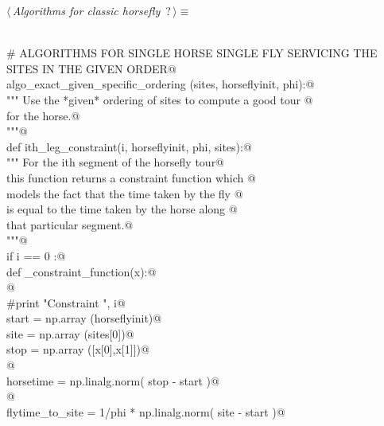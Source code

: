 \documentclass[11.5pt]{report}
\begin{document}
\begin{flushleft} \small\label{scrap21}\raggedright\small
{} $\langle\,${\itshape Algorithms for classic horsefly}\nobreak\ {\footnotesize {?}}$\,\rangle\equiv$
\vspace{-1ex}
\begin{list}{}{} \item
\mbox{}\verb@@\\
\mbox{}\verb@# ALGORITHMS FOR SINGLE HORSE SINGLE FLY SERVICING THE SITES IN THE GIVEN ORDER@\\
\mbox{}\verb@def algo_exact_given_specific_ordering (sites, horseflyinit, phi):@\\
\mbox{}\verb@    """ Use the *given* ordering of sites to compute a good tour @\\
\mbox{}\verb@    for the horse.@\\
\mbox{}\verb@    """@\\
\mbox{}\verb@    def ith_leg_constraint(i, horseflyinit, phi, sites):@\\
\mbox{}\verb@        """ For the ith segment of the horsefly tour@\\
\mbox{}\verb@        this function returns a constraint function which @\\
\mbox{}\verb@        models the fact that the time taken by the fly @\\
\mbox{}\verb@        is equal to the time taken by the horse along @\\
\mbox{}\verb@        that particular segment.@\\
\mbox{}\verb@        """@\\
\mbox{}\verb@        if i == 0 :@\\
\mbox{}\verb@            def _constraint_function(x):@\\
\mbox{}\verb@            @\\
\mbox{}\verb@                #print "Constraint  ", i@\\
\mbox{}\verb@                start = np.array (horseflyinit)@\\
\mbox{}\verb@                site  = np.array (sites[0])@\\
\mbox{}\verb@                stop  = np.array ([x[0],x[1]])@\\
\mbox{}\verb@            @\\
\mbox{}\verb@                horsetime = np.linalg.norm( stop - start )@\\
\mbox{}\verb@            @\\
\mbox{}\verb@                flytime_to_site   = 1/phi * np.linalg.norm( site - start )@\\

\end{list}
\end{flushleft}
\end{document}
